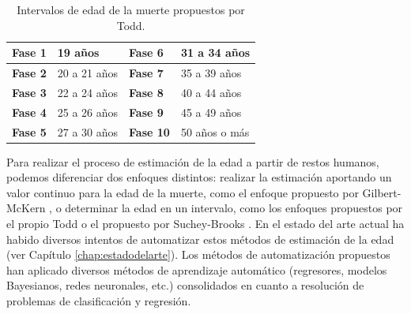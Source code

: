 
\begin{table}[ht!]
\centering
\begin{tabular}{|l|l|l|l|}
\hline
\textbf{Fase 1} & 19 años & \textbf{Fase 6} & 31 a 34 años \\ \hline
\textbf{Fase 2} & 20 a 21 años & \textbf{Fase 7} & 35 a 39 años \\ \hline
\textbf{Fase 3} & 22 a 24 años & \textbf{Fase 8} & 40 a 44 años \\ \hline
\textbf{Fase 4} & 25 a 26 años & \textbf{Fase 9} & 45 a 49 años \\ \hline
\textbf{Fase 5} & 27 a 30 años & \textbf{Fase 10} & 50 años o más \\ \hline
\end{tabular}%
\caption{Intervalos de edad de la muerte propuestos por Todd.}
\label{tab:rangosTodd}
\end{table}

Para realizar el proceso de estimación de la edad a partir de restos humanos, podemos diferenciar dos enfoques distintos: realizar la estimación aportando un valor continuo para la edad de la muerte, como el enfoque propuesto por Gilbert-McKern \cite{gilbert1973method}, o determinar la edad en un intervalo, como los enfoques propuestos por el propio Todd \cite{todd1921age} o el propuesto por Suchey-Brooks \cite{brooks1990skeletal}. En el estado del arte actual ha habido diversos intentos de automatizar estos métodos de estimación de la edad (ver Capítulo \ref{chap:estadodelarte}). Los métodos de automatización propuestos han aplicado diversos métodos de aprendizaje automático (regresores, modelos Bayesianos, redes neuronales, etc.) consolidados en cuanto a resolución de problemas de clasificación y regresión.\\

